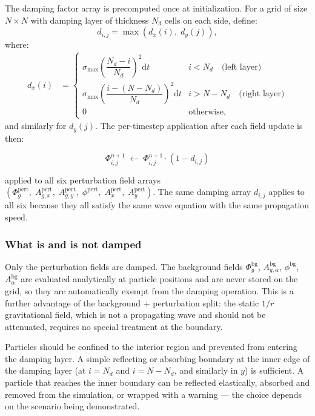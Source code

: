 \documentclass[11pt,a4paper]{article}
\newcommand{\Phig}{\Phi_g}
\newcommand{\dd}{\mathrm{d}}
\begin{document}
The damping factor array is precomputed once at initialization.  For a grid of size $N\times N$ with damping layer of thickness $N_d$ cells on each side, define:
\begin{equation}
  d_{i,j} = \max\!\left(d_x(i),\; d_y(j)\right),
\end{equation}
where:
\begin{align}
  d_x(i) &= \begin{cases}
    \sigma_{\max}\!\left(\dfrac{N_d - i}{N_d}\right)^2 \dd t & i < N_d \quad\text{(left layer)} \\[6pt]
    \sigma_{\max}\!\left(\dfrac{i - (N-N_d)}{N_d}\right)^2 \dd t & i > N - N_d \quad\text{(right layer)} \\
    0 & \text{otherwise,}
  \end{cases}
\end{align}
and similarly for $d_y(j)$.  The per-timestep application after each field update is then:

\begin{equation}
  \Phi^{n+1}_{i,j} \;\leftarrow\; \Phi^{n+1}_{i,j} \cdot (1 - d_{i,j})
\end{equation}

applied to all six perturbation field arrays $(\Phig^{\mathrm{pert}},\; A_{g,x}^{\mathrm{pert}},\; A_{g,y}^{\mathrm{pert}},\; \phi^{\mathrm{pert}},\; A_x^{\mathrm{pert}},\; A_y^{\mathrm{pert}})$.  The same damping array $d_{i,j}$ applies to all six because they all satisfy the same wave equation with the same propagation speed.

\subsubsection*{What is and is not damped}

Only the perturbation fields are damped.  The background fields $\Phig^{\mathrm{bg}}$, $A_{g,\alpha}^{\mathrm{bg}}$, $\phi^{\mathrm{bg}}$, $A_\alpha^{\mathrm{bg}}$ are evaluated analytically at particle positions and are never stored on the grid, so they are automatically exempt from the damping operation.  This is a further advantage of the background + perturbation split: the static $1/r$ gravitational field, which is not a propagating wave and should not be attenuated, requires no special treatment at the boundary.

Particles should be confined to the interior region and prevented from entering the damping layer.  A simple reflecting or absorbing boundary at the inner edge of the damping layer (at $i = N_d$ and $i = N - N_d$, and similarly in $y$) is sufficient.  A particle that reaches the inner boundary can be reflected elastically, absorbed and removed from the simulation, or wrapped with a warning — the choice depends on the scenario being demonstrated.
\end{document}
